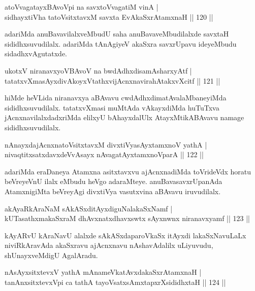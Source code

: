 \begin{shl}
atoV\s vagatayxBAvoV\s pi na savxtoV\s vagatiM vinA |\\
sidhayxtiVha tatoV\s sitxtavxM savxta EvAkaSxrAtamxnaH \hfill || 120 ||
\end{shl}

\begin{artha}
adariMda anuBavavilalxveMbudU saha anuBavaveMbudilalxde savxtaH sididhxsuvudilalx. adariMda tAnAgiyeV akaSxra savxrUpavu ideyeMbudu sidadhxvAgutatxde.
\end{artha}

\begin{shl}
ukotxV niranavxyoV\s BAvoV na bwdAdhxdisamAsharxyAtf |\\
tatatxvXmasAyxdivAkoyxVtathxvijAcnxnavirahAtakxvXcitf \hfill || 121 ||
\end{shl}

\begin{artha}%
hiMde heVLida niranavxya aBAvavu cwdAdhxdimatAvalaMbaneyiMda sididhxsuvudilalx. tatatxvXmasi muMtAda vAkayxdiMda huTuTxva jAcnxnavilalxdadxriMda elilxyU bAhayxdalUlx AtayxMtikABAvavu namage sididhxsuvudilalx.
\end{artha}

\begin{shl}
nAnayxdajAcnxnatoV\s sitxtavxM divxtiVyasAyx\s \s tamxnoV yathA  |\\
nivaqtitxsatxdavxdeVvAsayx nAvagatAyxtamxnoV\s parA \hfill || 122 ||
\end{shl}

\begin{artha}
adariMda eraDaneya Atamxna asitxtavxvu ajAcnxnadiMda toVrideVdx horatu beVreyeVnU ilalx eMbudu heVgo adaraMteye. anuBavasavxrUpanAda AtamxnigiMta beVreyAgi divxtiVya vasutxvina aBAvavu iruvudilalx.
\end{artha}

\begin{shl}
akAyaRkAraNaM sAkASxditAyxdiguNalakaSxNamf |\\
kUTasathxmakaSxraM dhAvxnatxdhavxswtx sAyxnwnx niranavxyamf \hfill || 123 ||
\end{shl}

\begin{artha}
kAyARvU kAraNavU alalxde sAkASxdaparoVkaSx itAyxdi lakaSxNavuLaLx niviRkAravAda akaSxravu ajAcnxnavu nAshavAdalilx uLiyuvudu, shUnayxveMdigU AgalAradu.
\end{artha}

\begin{shl}
nAsAyxsitxtevxV yathA mAnameVkatAvxdakaSxrAtamxnaH |\\
tanAnxsitxtevxV\s pi ca tathA tayoVsatxsAmxtapxrXsididhxtaH \hfill || 124 ||
\end{shl}

